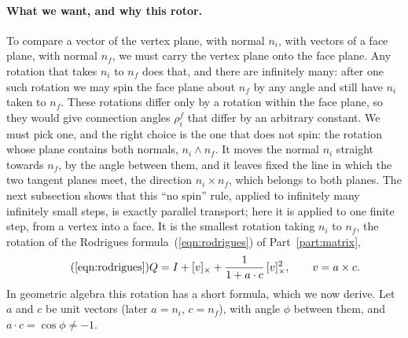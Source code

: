 \paragraph{What we want, and why this rotor.} To compare a vector of the vertex plane, with normal $n_i$, with vectors of a face plane, with normal $n_f$, we must carry the vertex plane onto the face plane. Any rotation that takes $n_i$ to $n_f$ does that, and there are infinitely many: after one such rotation we may spin the face plane about $n_f$ by any angle and still have $n_i$ taken to $n_f$. These rotations differ only by a rotation within the face plane, so they would give connection angles $\rho_i^f$ that differ by an arbitrary constant. We must pick one, and the right choice is the one that does not spin: the rotation whose plane contains both normals, $n_i\wedge n_f$. It moves the normal $n_i$ straight towards $n_f$, by the angle between them, and it leaves fixed the line in which the two tangent planes meet, the direction $n_i\times n_f$, which belongs to both planes. The next subsection shows that this ``no spin'' rule, applied to infinitely many infinitely small steps, is exactly parallel transport; here it is applied to one finite step, from a vertex into a face. It is the smallest rotation taking $n_i$ to $n_f$, the rotation of the Rodrigues formula~(\ref{eqn:rodrigues}) of Part~\ref{part:matrix},
\begin{equation*}
\tag{\ref{eqn:rodrigues}}
Q = I + [v]_\times + \frac{1}{1 + a \cdot c}\, [v]_\times^2 , \qquad v = a \times c .
\end{equation*}
In geometric algebra this rotation has a short formula, which we now derive. Let $a$ and $c$ be unit vectors (later $a = n_i$, $c = n_f$), with angle $\phi$ between them, and $a\cdot c = \cos\phi \ne -1$.

